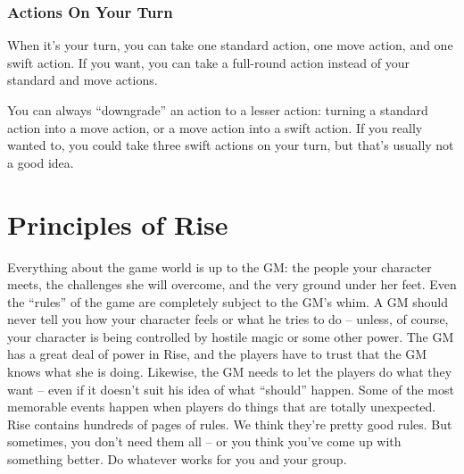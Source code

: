 \subsubsection{Actions On Your Turn}
When it's your turn, you can take one standard action, one move action, and one swift action. If you want, you can take a full-round action instead of your standard and move actions.

 You can always ``downgrade'' an action to a lesser action: turning a standard action into a move action, or a move action into a swift action. If you really wanted to, you could take three swift actions on your turn, but that's usually not a good idea.

\section{Principles of Rise}

\begin{itemize*}
     Everything about the game world is up to the GM: the people your character meets, the challenges she will overcome, and the very ground under her feet. Even the ``rules'' of the game are completely subject to the GM's whim.
     A GM should never tell you how your character feels or what he tries to do -- unless, of course, your character is being controlled by hostile magic or some other power.
     The GM has a great deal of power in Rise, and the players have to trust that the GM knows what she is doing. Likewise, the GM needs to let the players do what they want -- even if it doesn't suit his idea of what ``should'' happen. Some of the most memorable events happen when players do things that are totally unexpected.
     Rise contains hundreds of pages of rules. We think they're pretty good rules. But sometimes, you don't need them all -- or you think you've come up with something better. Do whatever works for you and your group.
\end{itemize*}
